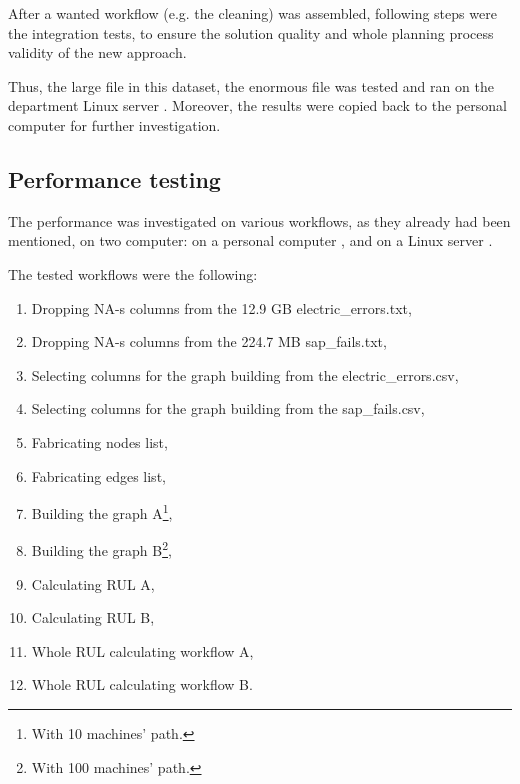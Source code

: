 After a wanted workflow (e.g. the cleaning) was assembled, following steps were the integration tests, to ensure the solution quality and whole planning process validity of the new approach.

Thus, the large file in this dataset, the enormous file was tested and ran on the department Linux server \cite{Batman}.
Moreover, the results were copied back to the personal computer for further investigation.
\subsection{Performance testing}
The performance was investigated on various workflows, as they already had been mentioned, on two computer: on a personal computer \cite{Latitude}, and on a Linux server \cite{Batman}.

The tested workflows were the following:
\begin{enumerate}
	\item{Dropping NA-s columns from the 12.9 GB electric\_errors.txt,}
	\item{Dropping NA-s columns from the 224.7 MB sap\_fails.txt,}
	\item{Selecting columns for the graph building from the electric\_errors.csv,}
	\item{Selecting columns for the graph building from the sap\_fails.csv,}
	\item{Fabricating nodes list,}
	\item{Fabricating edges list,}
	\item{Building the graph A\footnote{With 10 machines' path.},}
	\item{Building the graph B\footnote{With 100 machines' path.},}
	\item{Calculating RUL A,}
	\item{Calculating RUL B,}
	\item{Whole RUL calculating workflow A,}
	\item{Whole RUL calculating workflow B.}
\end{enumerate} 


